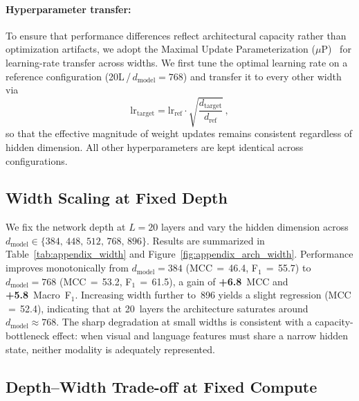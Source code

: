 \paragraph{Hyperparameter transfer:}
To ensure that performance differences reflect architectural capacity rather
than optimization artifacts, we adopt the Maximal Update Parameterization
($\mu$P)~\citep{yang2019wide} for learning-rate transfer across widths.  We
first tune the optimal learning rate on a reference configuration
(20L\,/\,$d_{\text{model}}{=}768$) and transfer it to every other width via
\begin{equation}
  \mathrm{lr}_{\text{target}}
  = \mathrm{lr}_{\text{ref}}
    \cdot \sqrt{\frac{d_{\text{target}}}{d_{\text{ref}}}}\,,
  \label{eq:mup}
\end{equation}
so that the effective magnitude of weight updates remains consistent
regardless of hidden dimension.  All other hyperparameters are kept identical
across configurations.

\subsection{Width Scaling at Fixed Depth}
\label{sec:width}



We fix the network depth at $L{=}20$ layers and vary the hidden dimension
across $d_{\text{model}} \in \{384,\, 448,\, 512,\, 768,\, 896\}$.
Results are summarized in Table~\ref{tab:appendix_width} and Figure~\ref{fig:appendix_arch_width}.
Performance improves monotonically from $d_{\text{model}}{=}384$
(MCC\,$=$\,46.4, F$_1$\,$=$\,55.7) to $d_{\text{model}}{=}768$
(MCC\,$=$\,53.2, F$_1$\,$=$\,61.5), a gain of \textbf{+6.8}~MCC and
\textbf{+5.8}~Macro~F$_1$.  Increasing width further to~896 yields a slight
regression (MCC\,$=$\,52.4), indicating that at 20~layers the architecture
saturates around $d_{\text{model}} \approx 768$.  The sharp degradation at
small widths is consistent with a capacity-bottleneck effect: when visual and
language features must share a narrow hidden state, neither modality is
adequately represented.

\subsection{Depth--Width Trade-off at Fixed Compute}
\label{sec:isocompute}

